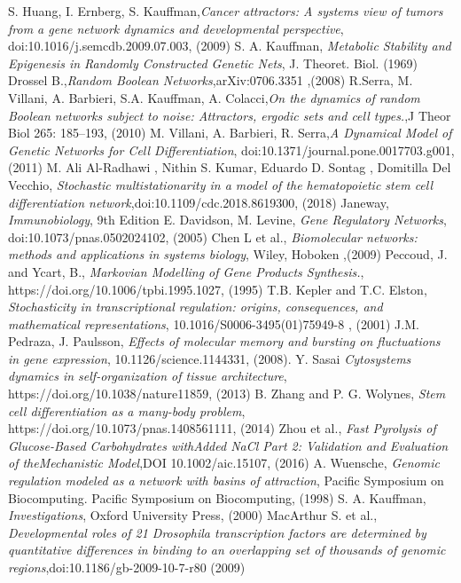 \begin{thebibliography}{90}
 S. Huang, I. Ernberg, S. Kauffman,\emph{Cancer attractors: A systems view of tumors from a gene network
dynamics and developmental perspective}, doi:10.1016/j.semcdb.2009.07.003, (2009)
 S. A. Kauffman, \emph{Metabolic Stability and Epigenesis in
Randomly Constructed Genetic Nets}, J. Theoret. Biol. (1969)
 Drossel B.,\emph{Random Boolean Networks},arXiv:0706.3351 ,(2008)
 R.Serra, M. Villani, A. Barbieri, S.A. Kauffman, A. Colacci,\emph{On the dynamics of random Boolean networks subject to noise:
Attractors, ergodic sets and cell types.},J Theor Biol 265: 185–193, (2010)
 M. Villani, A. Barbieri, R. Serra,\emph{A Dynamical Model of Genetic Networks for Cell Differentiation}, doi:10.1371/journal.pone.0017703.g001,(2011)
 M. Ali Al-Radhawi , Nithin S. Kumar, Eduardo D. Sontag , Domitilla Del Vecchio, \emph{Stochastic multistationarity in a model of the hematopoietic
stem cell differentiation network},doi:10.1109/cdc.2018.8619300, (2018)
 Janeway, \emph{Immunobiology}, 9th Edition
 E. Davidson, M. Levine, \emph{Gene Regulatory Networks}, doi:10.1073/pnas.0502024102, (2005)
 Chen L et al., \emph{Biomolecular networks: methods and applications in systems biology}, Wiley, Hoboken ,(2009)
 Peccoud, J. and Ycart, B., \emph{Markovian Modelling of Gene Products Synthesis.}, https://doi.org/10.1006/tpbi.1995.1027, (1995)
 T.B. Kepler and T.C. Elston, \emph{Stochasticity in transcriptional regulation: origins, consequences, and mathematical representations}, 10.1016/S0006-3495(01)75949-8 , (2001)
 J.M. Pedraza, J. Paulsson, \emph{Effects of molecular memory and bursting on fluctuations in gene expression}, 10.1126/science.1144331, (2008).
 Y. Sasai \emph{Cytosystems dynamics in self-organization of tissue architecture}, https://doi.org/10.1038/nature11859, (2013)
 B. Zhang and P. G. Wolynes, \emph{Stem cell differentiation as a many-body problem}, https://doi.org/10.1073/pnas.1408561111, (2014)
 Zhou et al., \emph{Fast Pyrolysis of Glucose-Based Carbohydrates withAdded NaCl Part 2: Validation and Evaluation of theMechanistic Model},DOI 10.1002/aic.15107, (2016)
 A. Wuensche, \emph{Genomic regulation modeled as a network with basins of attraction}, Pacific Symposium on Biocomputing. Pacific Symposium on Biocomputing, (1998)
 S. A. Kauffman, \emph{Investigations}, Oxford University
Press, (2000)
 MacArthur S. et al., \emph{Developmental roles of 21 Drosophila transcription factors are determined by quantitative differences in binding to an overlapping set of thousands of genomic regions},doi:10.1186/gb-2009-10-7-r80 (2009)

\end{thebibliography}
